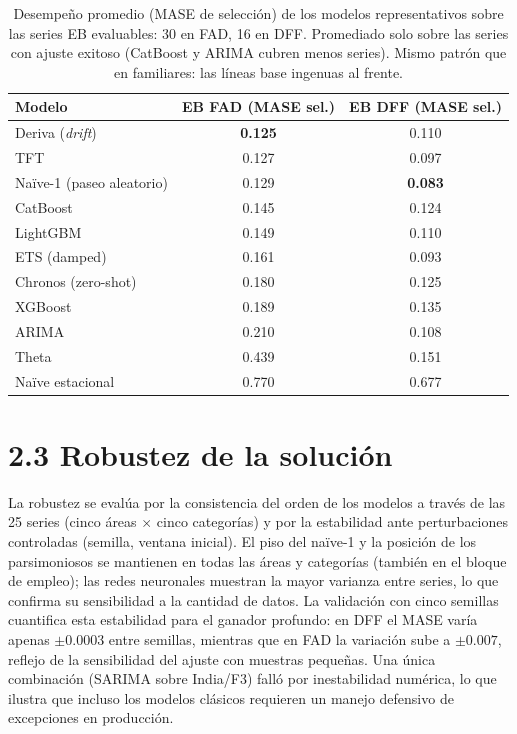 \documentclass[12pt,letterpaper]{report}
\begin{document}
\begin{table}[H]
\centering
\footnotesize
\caption[Comparación en categorías de empleo (EB)]{Desempeño promedio (MASE de selección)
de los modelos representativos sobre las series EB evaluables: 30 en FAD, 16 en DFF.
Promediado solo sobre las series con ajuste exitoso (CatBoost y ARIMA cubren menos
series). Mismo patrón que en familiares: las líneas base ingenuas al frente.}
\label{tab:comparacion_eb}
\begin{tabular}{lcc}
\toprule
\rowcolor{uacjblue!15}
\textbf{Modelo} & \textbf{EB FAD (MASE sel.)} & \textbf{EB DFF (MASE sel.)} \\ \midrule
Deriva (\textit{drift}) & \textbf{0.125} & 0.110 \\
TFT & 0.127 & 0.097 \\
Naïve-1 (paseo aleatorio) & 0.129 & \textbf{0.083} \\
CatBoost & 0.145 & 0.124 \\
LightGBM & 0.149 & 0.110 \\
ETS (damped) & 0.161 & 0.093 \\
Chronos (zero-shot) & 0.180 & 0.125 \\
XGBoost & 0.189 & 0.135 \\
ARIMA & 0.210 & 0.108 \\
Theta & 0.439 & 0.151 \\
Naïve estacional & 0.770 & 0.677 \\ \bottomrule
\end{tabular}
\end{table}

\section{2.3 Robustez de la solución}

La robustez se evalúa por la consistencia del orden de los modelos a través de las
25 series (cinco áreas $\times$ cinco categorías) y por la estabilidad ante
perturbaciones controladas (semilla, ventana inicial). El piso del naïve-1 y la posición
de los parsimoniosos se mantienen en todas las áreas y categorías (también en el bloque
de empleo); las redes neuronales muestran la mayor varianza entre series, lo que confirma
su sensibilidad a la cantidad de datos. La validación con cinco semillas cuantifica esta
estabilidad para el ganador profundo: en DFF el MASE varía apenas $\pm0.0003$ entre
semillas, mientras que en FAD la variación sube a $\pm0.007$, reflejo de la sensibilidad
del ajuste con muestras pequeñas. Una única combinación (SARIMA sobre India/F3) falló por
inestabilidad numérica, lo que ilustra que incluso los modelos clásicos requieren un
manejo defensivo de excepciones en producción.
\end{document}
